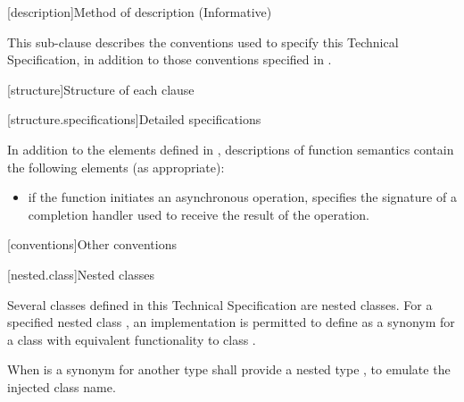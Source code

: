 
[description]{Method of description (Informative)}

\pnum
 This sub-clause describes the conventions used to specify this Technical Specification, in addition to those conventions specified in .


[structure]{Structure of each clause}


[structure.specifications]{Detailed specifications}

\pnum
In addition to the elements defined in , descriptions of function semantics contain the following elements (as appropriate):

\begin{itemize}
\item
\completionsig if the function initiates an asynchronous operation, specifies the signature of a completion handler used to receive the result of the operation.
\end{itemize}




[conventions]{Other conventions}


[nested.class]{Nested classes}

\pnum
Several classes defined in this Technical Specification are nested classes.
For a specified nested class , an implementation is permitted to
define  as a synonym for a class with equivalent functionality to
class . \begin{note} When  is a synonym for another
type  shall provide a nested type , to emulate the injected
class name. \end{note}


